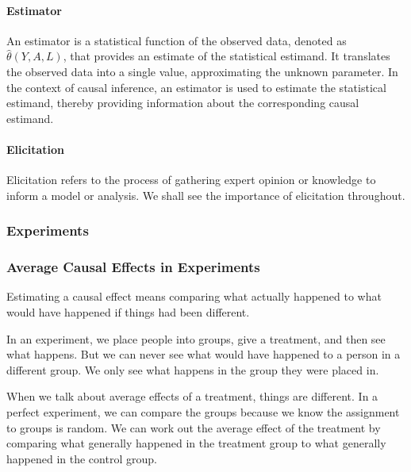 \documentclass[
  singlecolumn]{article}
\let\oldparagraph\paragraph
\renewcommand{\paragraph}[1]{\oldparagraph{#1}\mbox{}}
\begin{document}
\paragraph{\texorpdfstring{\textbf{Estimator}}{Estimator}}\label{estimator}

An estimator is a statistical function of the observed data, denoted as
\(\hat{\theta}(Y, A, L)\), that provides an estimate of the statistical
estimand. It translates the observed data into a single value,
approximating the unknown parameter. In the context of causal inference,
an estimator is used to estimate the statistical estimand, thereby
providing information about the corresponding causal estimand.

\paragraph{\texorpdfstring{\textbf{Elicitation}}{Elicitation}}\label{elicitation}

Elicitation refers to the process of gathering expert opinion or
knowledge to inform a model or analysis. We shall see the importance of
elicitation throughout.

\subsubsection{Experiments}\label{experiments}

\subsubsection{\texorpdfstring{\textbf{Average Causal Effects in
Experiments}}{Average Causal Effects in Experiments}}\label{average-causal-effects-in-experiments}

Estimating a causal effect means comparing what actually happened to
what would have happened if things had been different.

In an experiment, we place people into groups, give a treatment, and
then see what happens. But we can never see what would have happened to
a person in a different group. We only see what happens in the group
they were placed in.

When we talk about average effects of a treatment, things are different.
In a perfect experiment, we can compare the groups because we know the
assignment to groups is random. We can work out the average effect of
the treatment by comparing what generally happened in the treatment
group to what generally happened in the control group.
\end{document}
